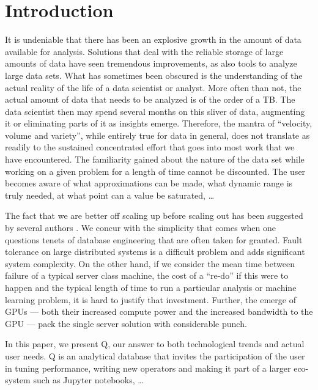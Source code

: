 \section{Introduction}

It is undeniable that there has been an explosive growth in the 
amount of data available for analysis. Solutions that 
deal with the reliable storage of large amounts of data have seen tremendous
improvements, as also tools to analyze large data sets. What has sometimes been
obscured is the understanding of the actual reality of the life of a data
scientist or analyst. More often than not, the actual amount of data that needs
to be analyzed is of the order of a TB. The data scientist then may spend
several months on this sliver of data, augmenting it or eliminating parts of it
as insights emerge. Therefore, the mantra of ``velocity, volume and variety'',
while entirely true for data in general, does not translate as readily to the
sustained concentrated effort that goes into most work that we have
encountered. The familiarity gained about the nature of the data set 
while working on a given problem for a length of time cannot be discounted. The
user becomes aware of what approximations can be made, what dynamic range is
truly needed, at what point can a value be saturated, \ldots

The fact that we are better off scaling up before scaling out has been suggested
by several authors \cite{Kyrola2012,Rowstron2012}. We concur with the simplicity
that comes when one questions tenets of database engineering that are often
taken for granted. Fault tolerance on large distributed systems is a difficult
problem and adds significant system complexity. On the other hand, if we
consider the mean time between failure of a typical server class machine, the
cost of a ``re-do'' if this were to happen and the typical length of time to run
a particular analysis or machine learning problem, it is hard to justify that
investment. 
Further, the emerge of GPUs --- both their increased compute power and the
increased  bandwidth to the GPU --- pack the single server solution with
considerable punch.

In this paper, we present Q, our answer to both technological trends and actual
user needs. Q is an analytical database that invites the participation of the
user in tuning performance, writing new operators and making it part of a larger
eco-system such as Jupyter notebooks, \ldots
